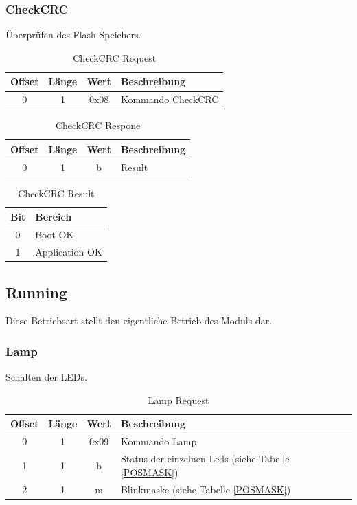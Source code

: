 \documentclass[10pt,a4paper]{article}
\begin{document}
\subsubsection{CheckCRC}
\label{CHECK_CRC}
\label{sec:CheckCRC}
Überprüfen des Flash Speichers.
\begin{table}[H]
\centering
\begin{tabular}{c|c|c|l}
\textbf{Offset} & \textbf{Länge} & \textbf{Wert} & \textbf{Beschreibung} \\ \hline
0 & 1 & 0x08 & Kommando CheckCRC\\
\end{tabular}
\caption{CheckCRC Request}
\end{table}
\begin{table}[H]
\centering
\begin{tabular}{c|c|c|l}
\textbf{Offset} & \textbf{Länge} & \textbf{Wert} & \textbf{Beschreibung} \\ \hline
0 & 1 & b & Result\\
\end{tabular}
\caption{CheckCRC Respone}
\end{table}
\begin{table}[H]
\centering
\begin{tabular}{c|l}
\textbf{Bit} & \textbf{Bereich} \\ \hline
0 & Boot OK\\
1 & Application OK\\
\end{tabular}
\caption{CheckCRC Result}
\end{table}


\subsection{Running}
Diese Betriebsart stellt den eigentliche Betrieb des Moduls dar.
\subsubsection{Lamp}
\label{sec:Lamp}
Schalten der LEDs.
\begin{table}[H]
\centering
\begin{tabular}{c|c|c|l}
\textbf{Offset} & \textbf{Länge} & \textbf{Wert} & \textbf{Beschreibung} \\ \hline
0 & 1 & 0x09 & Kommando Lamp\\
1 & 1 & b & Status der einzelnen Leds (siehe Tabelle \ref{POSMASK})\\
2 & 1 & m & Blinkmaske (siehe Tabelle \ref{POSMASK})
\end{tabular}
\caption{Lamp Request}
\end{table}
\end{document}
